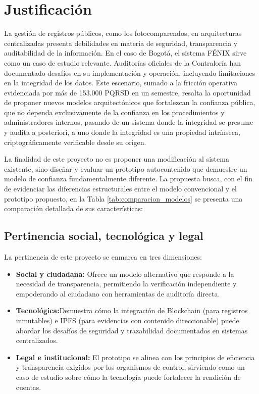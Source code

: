 \section{\large Justificación}
La gestión de registros públicos, como los fotocomparendos, en arquitecturas centralizadas presenta debilidades en materia de seguridad, transparencia y auditabilidad de la información. En el caso de Bogotá, el sistema FÉNIX sirve como un caso de estudio relevante. Auditorías oficiales de la Contraloría \parencite{Informe 170100-0054-24} \parencite{Informe de Cumplimiento No. 90, 2023} han documentado desafíos en su implementación y operación, incluyendo limitaciones en la integridad de los datos. Este escenario, sumado a la fricción operativa evidenciada por más de 153.000 PQRSD en un semestre, resalta la oportunidad de proponer nuevos modelos arquitectónicos que fortalezcan la confianza pública, que no dependa exclusivamente de la confianza en los procedimientos y administradores internos, pasando de un sistema donde la integridad se presume y audita a posteriori, a uno donde la integridad es una propiedad intrínseca, criptográficamente verificable desde su origen.

La finalidad de este proyecto no es proponer una modificación al sistema existente, sino diseñar y evaluar un prototipo autocontenido que demuestre un modelo de confianza fundamentalmente diferente. La propuesta busca, con el fin de evidenciar las diferencias estructurales entre el modelo convencional y el prototipo propuesto, en la Tabla \ref{tab:comparacion_modelos} se presenta una comparación detallada de sus características:



\subsection{Pertinencia social, tecnológica y legal} 
La pertinencia de este proyecto se enmarca en tres dimensiones:
\begin{itemize}
\item \textbf{Social y ciudadana:} Ofrece un modelo alternativo que responde a la necesidad de transparencia, permitiendo la verificación independiente y empoderando al ciudadano con herramientas de auditoría directa.
\item \textbf{Tecnológica:}Demuestra cómo la integración de Blockchain (para registros inmutables) e IPFS (para evidencias con contenido direccionable) puede abordar los desafíos de seguridad y trazabilidad documentados en sistemas centralizados.
\item \textbf{Legal e institucional:} El prototipo se alinea con los principios de eficiencia y transparencia exigidos por los organismos de control, sirviendo como un caso de estudio sobre cómo la tecnología puede fortalecer la rendición de cuentas.
\end{itemize}

